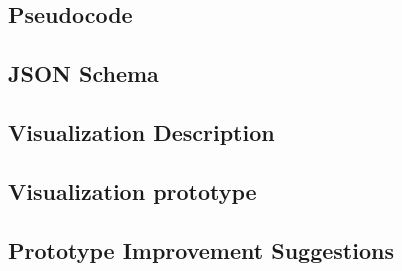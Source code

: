 \documentclass{article}
\begin{document}
\subsection{Pseudocode}

\subsection{JSON Schema}

\subsection{Visualization Description}

\subsection{Visualization prototype}

\subsection{Prototype Improvement Suggestions}
\end{document}
